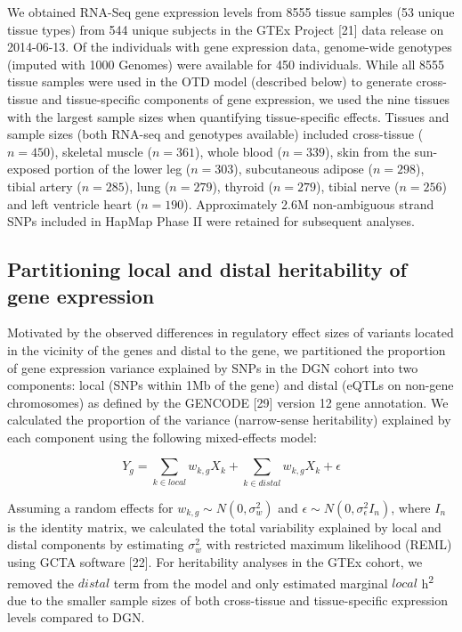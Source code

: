 \documentclass[10pt,letterpaper]{article}
\begin{document}
We obtained RNA-Seq gene expression levels from 8555 tissue samples (53
unique tissue types) from 544 unique subjects in the GTEx Project
{[}21{]} data release on 2014-06-13. Of the individuals with gene
expression data, genome-wide genotypes (imputed with 1000 Genomes) were
available for 450 individuals. While all 8555 tissue samples were used
in the OTD model (described below) to generate cross-tissue and
tissue-specific components of gene expression, we used the nine tissues
with the largest sample sizes when quantifying tissue-specific effects.
Tissues and sample sizes (both RNA-seq and genotypes available) included
cross-tissue (\(n=450\)), skeletal muscle (\(n=361\)), whole blood
(\(n=339\)), skin from the sun-exposed portion of the lower leg
(\(n=303\)), subcutaneous adipose (\(n=298\)), tibial artery
(\(n=285\)), lung (\(n=279\)), thyroid (\(n=279\)), tibial nerve
(\(n=256\)) and left ventricle heart (\(n=190\)). Approximately 2.6M
non-ambiguous strand SNPs included in HapMap Phase II were retained for
subsequent analyses.

\subsection*{Partitioning local and distal heritability of gene
expression}\label{partitioning-local-and-distal-heritability-of-gene-expression}

Motivated by the observed differences in regulatory effect sizes of variants located in the vicinity of the genes and distal to the gene,
we partitioned the proportion of gene expression variance explained by
SNPs in the DGN cohort into two components: local (SNPs within 1Mb of
the gene) and distal (eQTLs on non-gene chromosomes) as defined by the
GENCODE {[}29{]} version 12 gene annotation. We calculated the
proportion of the variance (narrow-sense heritability) explained by each
component using the following mixed-effects model:

\[ Y_g = \sum_{k  \in local}w_{k,g} X_k + \sum_{k  \in distal}w_{k,g} X_k + \epsilon \]

Assuming a random effects for \(w_{k,g} \sim N(0, \sigma^2_w)\) and
\(\epsilon \sim N(0, \sigma^2_{\epsilon} I_n)\), where \(I_n\) is the
identity matrix, we calculated the total variability explained by local
and distal components by estimating \(\sigma^2_w\) with restricted
maximum likelihood (REML) using GCTA software {[}22{]}. For heritability
analyses in the GTEx cohort, we removed the \(distal\) term from the
model and only estimated marginal \(local\) h\textsuperscript{2} due to
the smaller sample sizes of both cross-tissue and tissue-specific
expression levels compared to DGN. 
\end{document}
